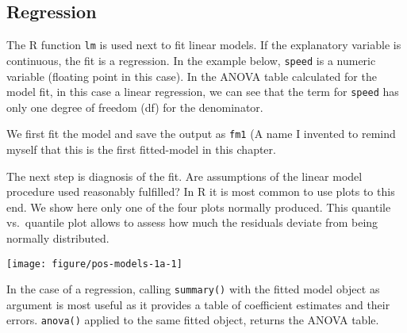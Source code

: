 \documentclass[paper=a4,headsepline,BCOR=12mm,twoside,open=right,%
titlepage,headings=small,fontsize=10pt,index=totoc,bibliography=totoc,%
captions=tableheading,captions=nooneline]{scrbook}\usepackage{knitr}
\begin{document}
\subsection{Regression}

The R function \texttt{lm} is used next to fit linear models. If the explanatory variable is continuous, the fit is a regression. In the example below, \texttt{speed} is a numeric variable (floating point in this case). In the ANOVA table calculated for the model fit, in this case a linear regression, we can see that the term for \texttt{speed} has only one degree of freedom (df) for the denominator.

We first fit the model and save the output as \texttt{fm1} (A name I invented to remind myself that this is the first fitted-model in this chapter.

\begin{knitrout}\footnotesize
{}\color{fgcolor}\begin{kframe}
\begin{alltt}
 \hlkwb{<-}  \hlopt{~}  
\end{alltt}
\end{kframe}
\end{knitrout}

The next step is diagnosis of the fit. Are assumptions of the linear model procedure used reasonably fulfilled? In R it is most common to use plots to this end. We show here only one of the four plots normally produced. This quantile vs.\ quantile plot allows to assess how much the residuals deviate from being normally distributed.

\begin{knitrout}\footnotesize
{}\color{fgcolor}\begin{kframe}
\begin{alltt}
  \hlstd{=} \hlstd{)}
\end{alltt}
\end{kframe}

{\centering \texttt{[image: figure/pos-models-1a-1]} 

}



\end{knitrout}

In the case of a regression, calling \texttt{summary()} with the fitted model object as argument is most useful as it provides a table of coefficient estimates and their errors. \texttt{anova()} applied to the same fitted object, returns the ANOVA table.
\end{document}
